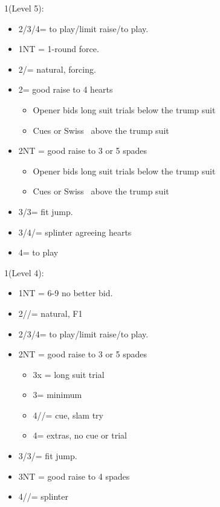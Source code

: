\documentclass[a4paper,14pt]{extarticle}
\begin{document}
\begin{itemize}
{\it
\item 1\spades (Level 5):
	\begin{itemize}
   \item 2\hearts/3\hearts/4\hearts = to play/limit raise/to play.
   \item 1NT = 1-round force.
   \item 2\clubs/\diamonds = natural, forcing.
   \item 2\spades = good raise to 4 hearts
		\begin{itemize}
		\item Opener bids long suit trials below the trump suit
		\item Cues or Swiss~ above the trump suit
		\end{itemize}
   \item 2NT = good raise to 3 or 5 spades
		\begin{itemize}
		\item Opener bids long suit trials below the trump suit
		\item Cues or Swiss~ above the trump suit
		\end{itemize}
   \item 3\clubs/3\diamonds = fit jump.
   \item 3\spades/4\clubs/\diamonds = splinter agreeing hearts
   \item 4\spades = to play
	\end{itemize}
}
{\color{CadetBlue}
\item 1\spades (Level 4):
	\begin{itemize}
   \item 1NT = 6-9 no better bid.
   \item 2\clubs/\diamonds/\hearts = natural, F1
   \item 2\spades/3\spades/4\spades = to play/limit raise/to play.
   \item 2NT = good raise to 3 or 5 spades
		\begin{itemize}
		\item 3x = long suit trial
		\item 3\spades = minimum
		\item 4\clubs/\diamonds/\diamonds = cue, slam try
		\item 4\spades = extras, no cue or trial
		\end{itemize}
   \item 3\clubs/3\diamonds/\hearts = fit jump.
	\item 3NT = good raise to 4 spades
   \item 4\clubs/\diamonds/\hearts = splinter
	\end{itemize}

}
\end{itemize}
\end{document}
